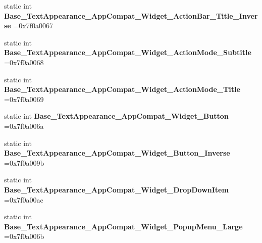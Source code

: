 \begin{DoxyCompactItemize}
\item 
\mbox{\label{classandroid_1_1support_1_1v7_1_1cardview_1_1R_1_1style_afa3ef176e6b21ecada66baaaac91223d}} 
static int {\bfseries Base\+\_\+\+Text\+Appearance\+\_\+\+App\+Compat\+\_\+\+Widget\+\_\+\+Action\+Bar\+\_\+\+Title\+\_\+\+Inverse} =0x7f0a0067
\item 
\mbox{\label{classandroid_1_1support_1_1v7_1_1cardview_1_1R_1_1style_ad54ec58b1a5dab87888ffcded8b7450b}} 
static int {\bfseries Base\+\_\+\+Text\+Appearance\+\_\+\+App\+Compat\+\_\+\+Widget\+\_\+\+Action\+Mode\+\_\+\+Subtitle} =0x7f0a0068
\item 
\mbox{\label{classandroid_1_1support_1_1v7_1_1cardview_1_1R_1_1style_adfc8026bf8e75d5f5583969e0a560c98}} 
static int {\bfseries Base\+\_\+\+Text\+Appearance\+\_\+\+App\+Compat\+\_\+\+Widget\+\_\+\+Action\+Mode\+\_\+\+Title} =0x7f0a0069
\item 
\mbox{\label{classandroid_1_1support_1_1v7_1_1cardview_1_1R_1_1style_a03e534f9271234d27cd6d00ce236fcdc}} 
static int {\bfseries Base\+\_\+\+Text\+Appearance\+\_\+\+App\+Compat\+\_\+\+Widget\+\_\+\+Button} =0x7f0a006a
\item 
\mbox{\label{classandroid_1_1support_1_1v7_1_1cardview_1_1R_1_1style_ac09cbd81ca8ce4e17eb050f9091ef546}} 
static int {\bfseries Base\+\_\+\+Text\+Appearance\+\_\+\+App\+Compat\+\_\+\+Widget\+\_\+\+Button\+\_\+\+Inverse} =0x7f0a009b
\item 
\mbox{\label{classandroid_1_1support_1_1v7_1_1cardview_1_1R_1_1style_ad71986fcf5d0a6209a5d2afc3bddad8e}} 
static int {\bfseries Base\+\_\+\+Text\+Appearance\+\_\+\+App\+Compat\+\_\+\+Widget\+\_\+\+Drop\+Down\+Item} =0x7f0a00ac
\item 
\mbox{\label{classandroid_1_1support_1_1v7_1_1cardview_1_1R_1_1style_a6c980b641ece930fa88f7d4cca7a1372}} 
static int {\bfseries Base\+\_\+\+Text\+Appearance\+\_\+\+App\+Compat\+\_\+\+Widget\+\_\+\+Popup\+Menu\+\_\+\+Large} =0x7f0a006b

\end{DoxyCompactItemize}
